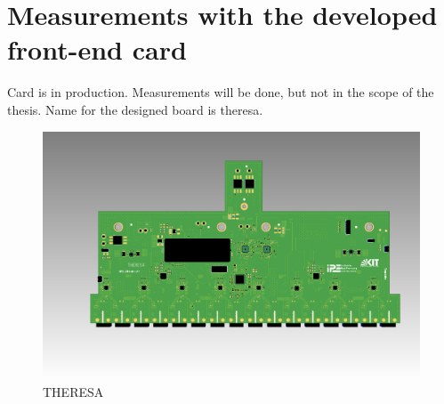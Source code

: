 \section{Measurements with the developed front-end card}
Card is in production. Measurements will be done, but not in the scope of the thesis.
Name for the designed board is \gls{theresa}.
\begin{figure}[H]
	\centering
	\includegraphics[width = \textwidth]{chap/06-conclusion/img/board_ugly}
	\caption{THERESA}
	\label{fig:board}
\end{figure}

